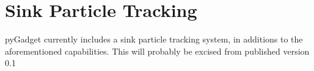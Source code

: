 \section{Sink Particle Tracking}
\label{sinks}
pyGadget currently includes a sink particle tracking system, in additions to the aforementioned capabilities.  This will probably be excised from published version 0.1